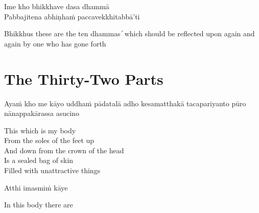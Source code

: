 Ime kho bhikkhave dasa dhammā\\
Pabbajitena abhiṇhaṁ paccavekkhitabbā'ti

\begin{english}
  Bhikkhus these are the ten dhammas  ̓  which should be reflected upon again and again by one who has gone forth
\end{english}

\suttaRef{[AN 10.48]}

\clearpage

\section{The Thirty-Two Parts}

\begin{leader}
\end{leader}

Ayaṁ kho me kāyo uddhaṁ pādatalā adho kesamatthakā tacapariyanto pūro nānappakārassa asucino

\begin{english}
  This which is my body\\
  From the soles of the feet up\\
  And down from the crown of the head\\
  Is a sealed bag of skin\\
  Filled with unattractive things
\end{english}

Atthi imasmiṁ kāye

\begin{english}
  In this body there are
\end{english}

